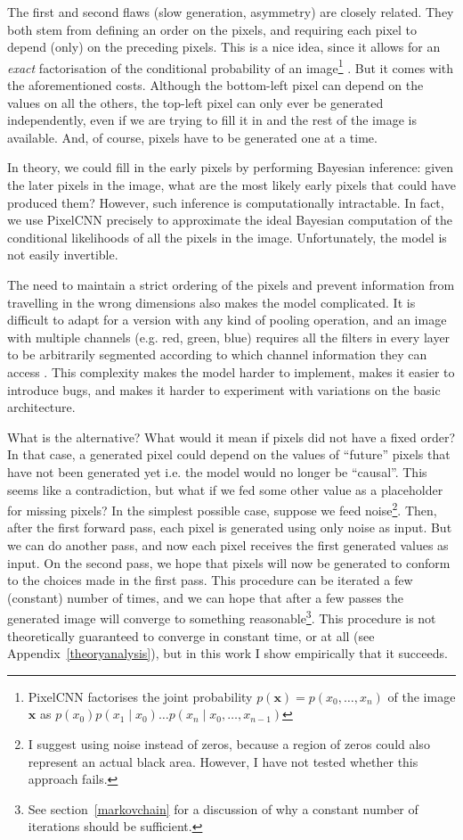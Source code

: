 \documentclass[11pt, a4paper, openany]{book}
\newcommand{\vect}[1]{\mathbf{#1}}
\newcommand{\nquote}[1]{``{#1}''}
\begin{document}
The first and second flaws (slow generation, asymmetry) are closely related. They both stem from defining an order on the pixels, and requiring each pixel to depend (only) on the preceding pixels. This is a nice idea, since it allows for an \emph{exact} factorisation of the conditional probability of an image\footnote{PixelCNN factorises the joint probability $p(\vect{x})=p(x_0,\dots,x_n)$ of the image $\vect{x}$ as $p(x_0)p(x_1\mid x_0)\dots p(x_n\mid x_0,\dots,x_{n-1})$} \citep{pixelcnn1}. But it comes with the aforementioned costs. Although the bottom-left pixel can depend on the values on all the others, the top-left pixel can only ever be generated independently, even if we are trying to fill it in and the rest of the image is available. And, of course, pixels have to be generated one at a time.

In theory, we could fill in the early pixels by performing Bayesian inference: given the later pixels in the image, what are the most likely early pixels that could have produced them? However, such inference is computationally intractable. In fact, we use PixelCNN precisely to approximate the ideal Bayesian computation of the conditional likelihoods of all the pixels in the image. Unfortunately, the model is not easily invertible.

The need to maintain a strict ordering of the pixels and prevent information from travelling in the wrong dimensions also makes the model complicated. It is difficult to adapt for a version with any kind of pooling operation, and an image with multiple channels (e.g. red, green, blue) requires all the filters in every layer to be arbitrarily segmented according to which channel information they can access \citep{pixelcnn2}. This complexity makes the model harder to implement, makes it easier to introduce bugs, and makes it harder to experiment with variations on the basic architecture.

What is the alternative? What would it mean if pixels did not have a fixed order? In that case, a generated pixel could depend on the values of \nquote{future} pixels that have not been generated yet i.e. the model would no longer be \nquote{causal}. This seems like a contradiction, but what if we fed some other value as a placeholder for missing pixels? In the simplest possible case, suppose we feed noise\footnote{I suggest using noise instead of zeros, because a region of zeros could also represent an actual black area. However, I have not tested whether this approach fails.}. Then, after the first forward pass, each pixel is generated using only noise as input. But we can do another pass, and now each pixel receives the first generated values as input. On the second pass, we hope that pixels will now be generated to conform to the choices made in the first pass. This procedure can be iterated a few (constant) number of times, and we can hope that after a few passes the generated image will converge to something reasonable\footnote{See section~\ref{markovchain} for a discussion of why a constant number of iterations should be sufficient.}. This procedure is not theoretically guaranteed to converge in constant time, or at all (see Appendix~\ref{theoryanalysis}), but in this work I show empirically that it succeeds.
\end{document}
